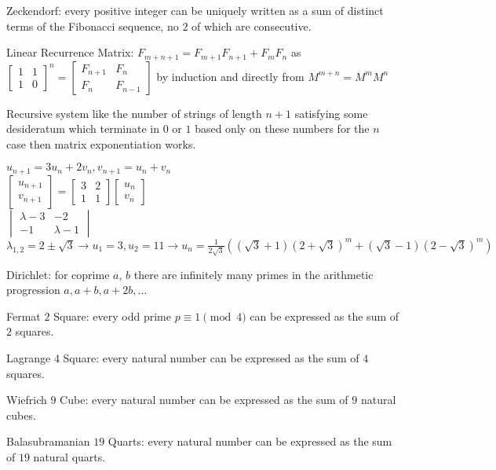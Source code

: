 Zeckendorf: every positive integer can be uniquely written as a sum of distinct terms of the Fibonacci sequence, no $2$ of which are consecutive.

Linear Recurrence Matrix: $F_{m+n+1}=F_{m+1}F_{n+1}+F_{m}F_{n}$ as $\begin{bmatrix} 1 & 1 \\ 1 & 0 \end{bmatrix}^n = \begin{bmatrix} F_{n+1} & F_n \\ F_n & F_{n-1} \end{bmatrix}$ by induction and directly from $M^{m+n}=M^m M^n$

Recursive system like the number of strings of length $n+1$ satisfying some desideratum which terminate in $0$ or $1$ based only on these numbers for the $n$ case then matrix exponentiation works.

$u_{n+1}=3u_n+2v_n,v_{n+1}=u_n+v_n$ \\
$\begin{bmatrix} u_{n+1} \\ v_{n+1} \end{bmatrix} = \begin{bmatrix} 3 & 2 \\ 1 & 1 \end{bmatrix} \begin{bmatrix} u_n \\ v_n \end{bmatrix}$ \\
$\begin{vmatrix} \lambda-3 & -2 \\ -1 & \lambda-1 \end{vmatrix}$ \\
$\lambda_{1,2}=2 \pm \sqrt{3} \to u_1=3, u_2=11 \to u_n = \frac{1}{2 \sqrt{3}} ((\sqrt{3}+1)(2+\sqrt{3})^m+(\sqrt{3}-1)(2-\sqrt{3})^m)$

Dirichlet: for coprime $a$, $b$ there are infinitely many primes in the arithmetic progression $a,a+b,a+2b,\dots$

Fermat $2$ Square: every odd prime $p \equiv 1 \pmod{4}$ can be expressed as the sum of $2$ squares.

Lagrange $4$ Square: every natural number can be expressed as the sum of $4$ squares.

Wiefrich $9$ Cube: every natural number can be expressed as the sum of $9$ natural cubes.

Balasubramanian $19$ Quarts: every natural number can be expressed as the sum of $19$ natural quarts.

